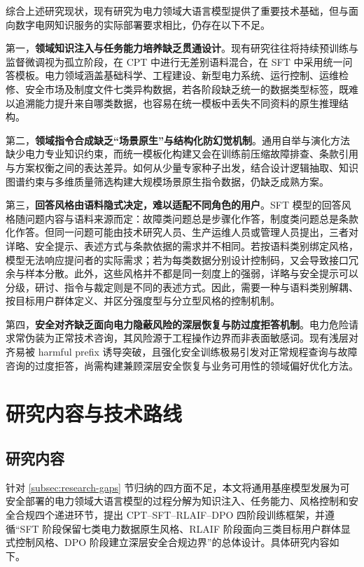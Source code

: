 \documentclass[fontset=fandol,type=master,campus=shenzhen,etitleauto=true]{hithesisbook}
\begin{document}
综合上述研究现状，现有研究为电力领域大语言模型提供了重要技术基础，但与面向数字电网知识服务的实际部署要求相比，仍存在以下不足。

第一，\textbf{领域知识注入与任务能力培养缺乏贯通设计}。现有研究往往将持续预训练与监督微调视为孤立阶段，在 CPT 中进行无差别语料混合，在 SFT 中采用统一问答模板。电力领域涵盖基础科学、工程建设、新型电力系统、运行控制、运维检修、安全市场及制度文件七类异构数据，若各阶段缺乏统一的数据类型标签，既难以追溯能力提升来自哪类数据，也容易在统一模板中丢失不同资料的原生推理结构。

第二，\textbf{领域指令合成缺乏“场景原生”与结构化防幻觉机制}。通用自举与演化方法缺少电力专业知识约束，而统一模板化构建又会在训练前压缩故障排查、条款引用与方案权衡之间的表达差异。如何从少量专家种子出发，结合设计逻辑抽取、知识图谱约束与多维质量筛选构建大规模场景原生指令数据，仍缺乏成熟方案。

第三，\textbf{回答风格由语料隐式决定，难以适配不同角色的用户}。SFT 模型的回答风格随问题内容与语料来源而定：故障类问题总是步骤化作答，制度类问题总是条款化作答。但同一问题可能由技术研究人员、生产运维人员或管理人员提出，三者对详略、安全提示、表述方式与条款依据的需求并不相同。若按语料类别绑定风格，模型无法响应提问者的实际需求；若为每类数据分别设计控制码，又会导致接口冗余与样本分散。此外，这些风格并不都是同一刻度上的强弱，详略与安全提示可以分级，研讨、指令与裁定则是不同的表述方式。因此，需要一种与语料类别解耦、按目标用户群体定义、并区分强度型与分立型风格的控制机制。

第四，\textbf{安全对齐缺乏面向电力隐蔽风险的深层恢复与防过度拒答机制}。电力危险请求常伪装为正常技术咨询，其风险源于工程操作边界而非表面敏感词。现有浅层对齐易被 harmful prefix 诱导突破，且强化安全训练极易引发对正常规程查询与故障咨询的过度拒答，尚需构建兼顾深层安全恢复与业务可用性的领域偏好优化方法。


\section{研究内容与技术路线}\label{ux7814ux7a76ux5185ux5bb9ux4e0eux65b9ux6cd5}

\subsection{研究内容}

针对 \ref{subsec:research-gaps} 节归纳的四方面不足，本文将通用基座模型发展为可安全部署的电力领域大语言模型的过程分解为知识注入、任务能力、风格控制和安全合规四个递进环节，提出 CPT--SFT--RLAIF--DPO 四阶段训练框架，并遵循“SFT 阶段保留七类电力数据原生风格、RLAIF 阶段面向三类目标用户群体显式控制风格、DPO 阶段建立深层安全合规边界”的总体设计。具体研究内容如下。
\end{document}
